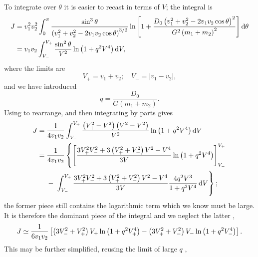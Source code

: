To integrate over $\theta$ it is easier to recast in terms of $V$; the integral is
\begin{align}
J = {} & v_1^2 v_2^2 \int_{0}^{\pi}{\dfrac{\sin^3\theta}{\left(v_1^2 + v_2^2 - 2v_1 v_2 \cos\theta\right)^{3/2}}\ln\left[1 + \dfrac{D_0\left(v_1^2 + v_2^2 - 2v_1 v_2 \cos\theta\right)^2}{G^2\left(m_1 + m_2\right)^2}\right]}\,\mathrm{d}{\theta} \\
 = {} & v_1 v_2 \int_{V_-}^{V_+}{\dfrac{\sin^2\theta}{V^2}\ln\left(1 + q^2V^4\right)}\,\mathrm{d}{V},
\end{align}
where the limits are
\begin{equation}
V_+ = v_1 + v_2; \quad V_- = |v_1 - v_2|,
\end{equation}
and we have introduced
\begin{equation}
q = \dfrac{D_0}{G\left(m_1+m_2\right)}.
\end{equation}
Using  to rearrange, and then integrating by parts gives
\begin{align}
J = {} & \recip{4 v_1 v_2} \intd{V_-}{V_+}{\dfrac{\left(V_+^2 - V^2\right)\left(V^2 - V_-^2\right)}{V^2}\ln\left(1 + q^2V^4\right)}{V} \\
 = {} & \recip{4 v_1 v_2} \left\{\left[\dfrac{3V_+^2V_-^2 + 3\left(V_+^2 + V_-^2\right)V^2 - V^4}{3V} \ln\left(1 + q^2V^4\right)\right]^{V_+}_{V_-} \right. \nonumber \\* 
 {} & - \left. \vphantom{\left[\dfrac{\left(V_+^2\right)V^2}{3V}\right]^{V_+}_{V_-}} \intd{V_-}{V_+}{\dfrac{3V_+^2V_-^2 + 3\left(V_+^2 + V_-^2\right)V^2 - V^4}{3V}\dfrac{4q^2V^3}{1+ q^2V^4}}{V}\right\};
\end{align}
the former piece still contains the logarithmic term which we know must be large. It is therefore the dominant piece of the integral and we neglect the latter \citep{Chandrasekhar1941},
\begin{equation}
J \simeq \dfrac{1}{6 v_1 v_2} \left[\left(3V_-^2 + V_+^2\right)V_+\ln\left(1 + q^2V_+^4\right) - \left(3V_+^2 + V_-^2\right)V_-\ln\left(1 + q^2V_-^4\right)\right].
\end{equation}
This may be further simplified, reusing the limit of large $q$ \citep{Chandrasekhar1941,Chandrasekhar1941b},
